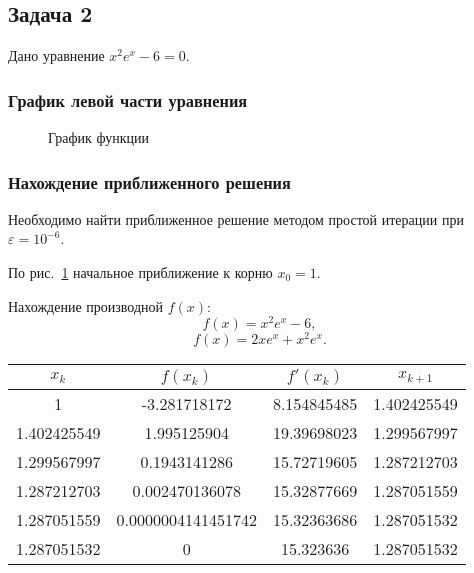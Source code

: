 \documentclass[10pt, a4paper, titlepage]{article}
\begin{document}
\subsection{Задача 2}

Дано уравнение $x^2e^x-6=0$.

\subsubsection{График левой части уравнения}
\begin{figure}[H]
    \centering
    \caption{График функции}
    \label{sr1Task2Function}
\end{figure}

\subsubsection{Нахождение приближенного решения}

Необходимо найти приближенное решение методом простой итерации при $\varepsilon=10^{-6}$.

По рис.~\ref{sr1Task2Function} начальное приближение к корню $x_0=1$.

Нахождение производной $f(x)$: $$f(x)=x^2e^x-6,$$ $$f(x)=2xe^x+x^2e^x.$$

\begin{center}
    \begin{tabular}{|c|c|c|c|}
        \hline
        $x_k$ & $f(x_k)$ & $f'(x_k)$ & $x_{k+1}$ \\ \hline
        
        1 & -3.281718172 & 8.154845485 & 1.402425549 \\ \hline
        
        1.402425549 & 1.995125904 & 19.39698023 & 1.299567997 \\ \hline
        
        1.299567997 & 0.1943141286 & 15.72719605 & 1.287212703 \\ \hline
        
        1.287212703 & 0.002470136078 & 15.32877669 & 1.287051559 \\ \hline
        
        1.287051559 & 0.0000004141451742 & 15.32363686 & 1.287051532 \\ \hline
        
        1.287051532 & 0 & 15.323636 & 1.287051532 \\ \hline
        
    \end{tabular}
\end{center}
\end{document}

